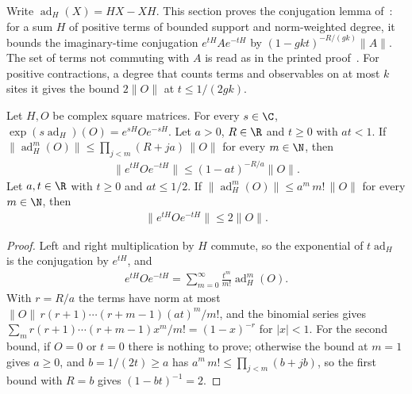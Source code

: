 Write $\operatorname{ad}_H(X)=HX-XH$. This section proves the conjugation lemma
of~\cite[lines 795--880]{Arad2014Connecting}: for a sum $H$ of positive terms of
bounded support and norm-weighted degree, it bounds the imaginary-time conjugation
$e^{tH}Ae^{-tH}$ by $(1-gkt)^{-R/(gk)}\lVert A\rVert$. The set of terms not commuting
with $A$ is read as in the printed proof~\cite{gap:akl14_hadamard_bound_scope}. For
positive contractions, a degree that counts terms and observables on at most $k$ sites
it gives the bound $2\lVert O\rVert$ at $t\le1/(2gk)$.

\begin{theorem}
    \label{thm:factorial_growth_rate_conjugation}
    \leanok
    Let $H,O$ be complex square matrices. For every $s\in\C$,
    $\exp(s\operatorname{ad}_H)(O)=e^{sH}Oe^{-sH}$. Let $a>0$, $R\in\R$ and $t\ge0$
    with $at<1$. If
    $\lVert\operatorname{ad}_H^m(O)\rVert\le\prod_{j<m}(R+ja)\,\lVert O\rVert$ for
    every $m\in\N$, then
    \begin{align}
        \lVert e^{tH}Oe^{-tH}\rVert\le(1-at)^{-R/a}\lVert O\rVert.
    \end{align}
    Let $a,t\in\R$ with $t\ge0$ and $at\le1/2$. If
    $\lVert\operatorname{ad}_H^m(O)\rVert\le a^m\,m!\,\lVert O\rVert$ for every
    $m\in\N$, then
    \begin{align}
        \lVert e^{tH}Oe^{-tH}\rVert\le2\lVert O\rVert.
    \end{align}
\end{theorem}
\begin{proof}\leanok
    Left and right multiplication by $H$ commute, so the exponential of
    $t\operatorname{ad}_H$ is the conjugation by $e^{tH}$, and
    \begin{align}
        e^{tH}Oe^{-tH}=\sum_{m=0}^{\infty}\frac{t^m}{m!}\operatorname{ad}_H^m(O).
    \end{align}
    With $r=R/a$ the terms have norm at most
    $\lVert O\rVert\,r(r+1)\cdots(r+m-1)(at)^m/m!$, and the binomial series gives
    $\sum_m r(r+1)\cdots(r+m-1)x^m/m!=(1-x)^{-r}$ for $\lvert x\rvert<1$. For the
    second bound, if $O=0$ or $t=0$ there is nothing to prove; otherwise the bound at
    $m=1$ gives $a\ge0$, and $b=1/(2t)\ge a$ has $a^m\,m!\le\prod_{j<m}(b+jb)$, so the
    first bound with $R=b$ gives $(1-bt)^{-1}=2$.
\end{proof}

